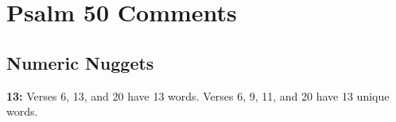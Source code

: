 \section{Psalm 50 Comments}

\subsection{Numeric Nuggets}
\textbf{13:} Verses 6, 13, and 20 have 13 words. Verses 6, 9, 11, and 20 have 13 unique words.

%


